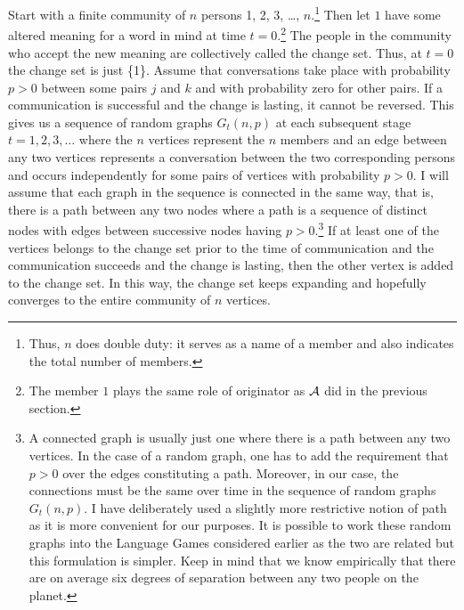 Start with a finite community of $n$ persons 1, 2, 3, \ldots , $n$.\footnote{Thus, $n$ does double duty: it serves as a name of a member and also indicates the total number of members.} Then let $1$ have some altered meaning for a word in mind at time $t = 0$.\footnote{The member $1$ plays the same role of originator as $\cal A$ did in the previous section.} The people in the community who accept the new meaning are collectively called the change set. Thus, at $t = 0$ the change set is just \{1\}. Assume that conversations take place with probability $p > 0$ between some pairs $j$ and $k$ and with probability zero for other pairs. If a communication is successful and the change is lasting, it cannot be reversed. This gives us a sequence of random graphs $G_t(n,p)$ at each subsequent stage $t = 1,2,3, \ldots$ where the $n$ vertices represent the $n$ members and an edge between any two vertices represents a conversation between the two corresponding persons and occurs independently for some pairs of vertices with probability $p > 0$. I will assume that each graph in the sequence is connected in the same way, that is, there is a path between any two nodes where a path is a sequence of distinct nodes with edges between successive nodes having $p > 0$.\footnote{A connected graph is usually just one where there is a path between any two vertices. In the case of a random graph, one has to add the requirement that $p > 0$ over the edges constituting a path. Moreover, in our case, the connections must be the same over time in the sequence of random graphs $G_t(n,p)$. I have deliberately used a slightly more restrictive notion of path as it is more convenient for our purposes. It is possible to work these random graphs into the Language Games considered earlier as the two are related but this formulation is simpler. Keep in mind that we know empirically that there are on average six degrees of separation between any two people on the planet.} If at least one of the vertices belongs to the change set prior to the time of communication and the communication succeeds and the change is lasting, then the other vertex is added to the change set. In this way, the change set keeps expanding and hopefully converges to the entire community of $n$ vertices.


